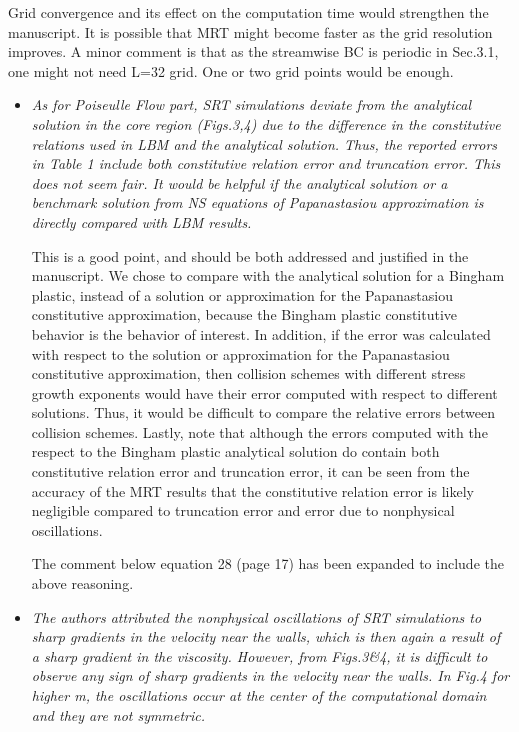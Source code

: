 \documentclass{article}
\begin{document}
	Grid convergence and its effect on the computation time would strengthen the manuscript. It is possible that MRT might become faster as the grid resolution improves. A minor comment is that as the streamwise BC is periodic in Sec.3.1, one might not need L=32 grid. One or two grid points would be enough.
	
	\begin{itemize}
	\item \emph{As for Poiseulle Flow part, SRT simulations deviate from the analytical solution in the core region (Figs.3,4) due to the difference in the constitutive relations used in LBM and the analytical solution. Thus, the reported errors in Table 1 include both constitutive relation error and truncation error. This does not seem fair. It would be helpful if the analytical solution or a benchmark solution from NS equations of Papanastasiou approximation is directly compared with LBM results.}
	
	This is a good point, and should be both addressed and justified in the manuscript. We chose to compare with the analytical solution for a Bingham plastic, instead of a solution or approximation for the Papanastasiou constitutive approximation, because the Bingham plastic constitutive behavior is the behavior of interest. In addition, if the error was calculated with respect to the solution or approximation for the Papanastasiou constitutive approximation, then collision schemes with different stress growth exponents would have their error computed with respect to different solutions. Thus, it would be difficult to compare the relative errors between collision schemes. Lastly, note that although the errors computed with the respect to the Bingham plastic analytical solution do contain both constitutive relation error and truncation error, it can be seen from the accuracy of the MRT results that the constitutive relation error is likely negligible compared to truncation error and error due to nonphysical oscillations.
	
	The comment below equation 28 (page 17) has been expanded to include the above reasoning.
	
	\item \emph{The authors attributed the nonphysical oscillations of SRT simulations to sharp gradients in the velocity near the walls, which is then again a result of a sharp gradient in the viscosity. However, from Figs.3\&4, it is difficult to observe any sign of sharp gradients in the velocity near the walls. In Fig.4 for higher m, the oscillations occur at the center of the computational domain and they are not symmetric.}
	

\end{itemize}
\end{document}
